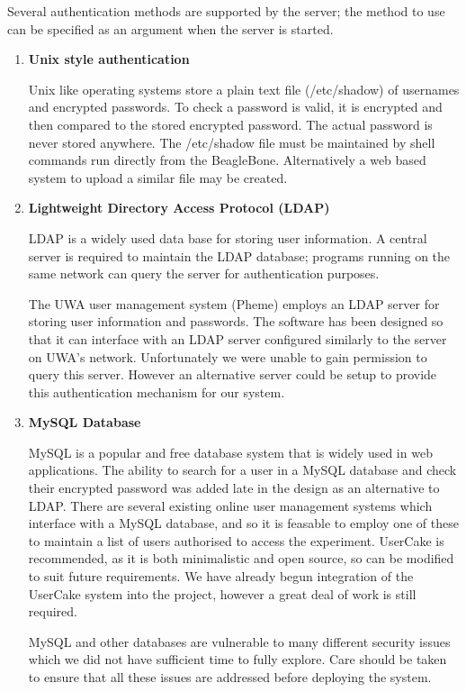 Several authentication methods are supported by the server; the method to use can be specified as an argument when the server is started.
\begin{enumerate}
  \item {\bf Unix style authentication}


  Unix like operating systems store a plain text file (/etc/shadow) of usernames and encrypted passwords. To check a password is valid, it is encrypted and then compared to the stored encrypted password. The actual password is never stored anywhere. The /etc/shadow file must be maintained by shell commands run directly from the BeagleBone. Alternatively a web based system to upload a similar file may be created.

  \item {\bf Lightweight Directory Access Protocol (LDAP)}

  LDAP is a widely used data base for storing user information. A central server is required to maintain the LDAP database; programs running on the same network can query the server for authentication purposes.

  The UWA user management system (Pheme) employs an LDAP server for storing user information and passwords. The software has been designed so that it can interface with an LDAP server configured similarly to the server on UWA's network. Unfortunately we were unable to gain permission to query this server. However an alternative server could be setup to provide this authentication mechanism for our system.


  \item {\bf MySQL Database}

        MySQL is a popular and free database system that is widely used in web applications. The ability to search for a user in a MySQL database and check their encrypted password was added late in the design as an alternative to LDAP. There are several existing online user management systems which interface with a MySQL database, and so it is feasable to employ one of these to maintain a list of users authorised to access the experiment. UserCake is recommended, as it is both minimalistic and open source, so can be modified to suit future requirements. We have already begun integration of the UserCake system into the project, however a great deal of work is still required.


  MySQL and other databases are vulnerable to many different security issues which we did not have sufficient time to fully explore. Care should be taken to ensure that all these issues are addressed before deploying the system.


\end{enumerate}

